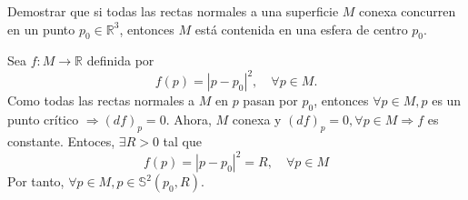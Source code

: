 \begin{ejr}[5]
  Demostrar que si todas las rectas normales a una superficie $M$ conexa concurren en un punto $p_{0} \in \mathbb{R}^{3}$, entonces $M$ está contenida en una esfera de centro $p_{0}$.
\end{ejr}

\begin{sol}
  Sea $f : M \to \mathbb{R}$ definida por
  \[ 
    f(p) = | p -p_{0} |^{2}, \quad \forall p \in M.
  \] 
  Como todas las rectas normales a $M$ en $p$ pasan por $p_{0}$, entonces $\forall p \in M, p$ es un punto crítico $\Rightarrow (d f)_{p} = 0$. Ahora, $M$ conexa y $(d f)_{p} = 0, \forall p \in M \Rightarrow f$ es constante. Entoces, $\exists R>0$ tal que
  \[ 
    f(p) = | p - p_{0} |^{2} = R, \quad \forall p \in M 
  \] 
  Por tanto, $\forall p \in M, p \in \mathbb{S}^{2}(p_{0}, R)$.
\end{sol}
